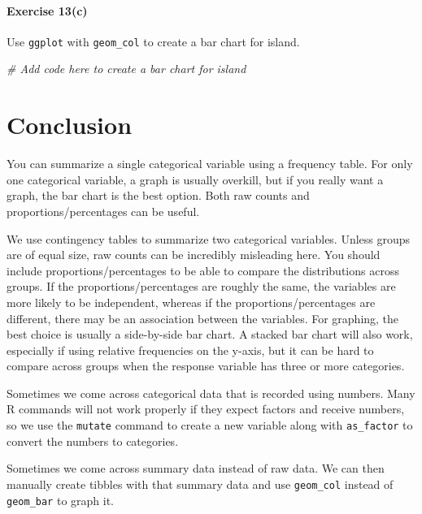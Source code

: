 \documentclass[
]{book}
\newenvironment{Shaded}{\begin{snugshade}}{\end{snugshade}}
\newcommand{\CommentTok}[1]{\textcolor[rgb]{0.56,0.35,0.01}{\textit{#1}}}
\begin{document}
\hypertarget{exercise-13c}{%
\paragraph*{Exercise 13(c)}\label{exercise-13c}}

Use \texttt{ggplot} with \texttt{geom\_col} to create a bar chart for island.

\begin{Shaded}
\begin{Highlighting}[]
\CommentTok{\# Add code here to create a bar chart for island}
\end{Highlighting}
\end{Shaded}

\hypertarget{categorical-conclusion}{%
\section{Conclusion}\label{categorical-conclusion}}

You can summarize a single categorical variable using a frequency table. For only one categorical variable, a graph is usually overkill, but if you really want a graph, the bar chart is the best option. Both raw counts and proportions/percentages can be useful.

We use contingency tables to summarize two categorical variables. Unless groups are of equal size, raw counts can be incredibly misleading here. You should include proportions/percentages to be able to compare the distributions across groups. If the proportions/percentages are roughly the same, the variables are more likely to be independent, whereas if the proportions/percentages are different, there may be an association between the variables. For graphing, the best choice is usually a side-by-side bar chart. A stacked bar chart will also work, especially if using relative frequencies on the y-axis, but it can be hard to compare across groups when the response variable has three or more categories.

Sometimes we come across categorical data that is recorded using numbers. Many R commands will not work properly if they expect factors and receive numbers, so we use the \texttt{mutate} command to create a new variable along with \texttt{as\_factor} to convert the numbers to categories.

Sometimes we come across summary data instead of raw data. We can then manually create tibbles with that summary data and use \texttt{geom\_col} instead of \texttt{geom\_bar} to graph it.
\end{document}
